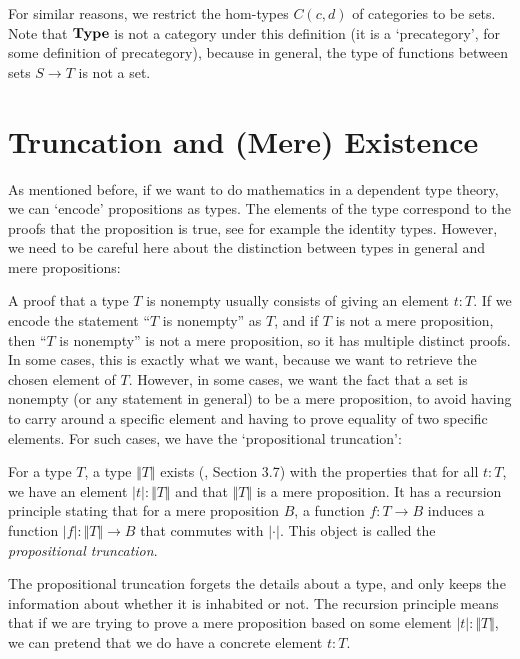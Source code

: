 For similar reasons, we restrict the hom-types $ C(c, d) $ of categories to be sets. Note that $ \mathbf{Type} $ is not a category under this definition (it is a `precategory', for some definition of precategory), because in general, the type of functions between sets $ S \to T $ is not a set.

\section{Truncation and (Mere) Existence}
As mentioned before, if we want to do mathematics in a dependent type theory, we can `encode' propositions as types. The elements of the type correspond to the proofs that the proposition is true, see for example the identity types. However, we need to be careful here about the distinction between types in general and mere propositions:

A proof that a type $ T $ is nonempty usually consists of giving an element $ t : T $. If we encode the statement ``$ T $ is nonempty'' as $ T $, and if $ T $ is not a mere proposition, then ``$ T $ is nonempty'' is not a mere proposition, so it has multiple distinct proofs. In some cases, this is exactly what we want, because we want to retrieve the chosen element of $ T $. However, in some cases, we want the fact that a set is nonempty (or any statement in general) to be a mere proposition, to avoid having to carry around a specific element and having to prove equality of two specific elements. For such cases, we have the `propositional truncation':

\begin{definition}
  For a type $ T $, a type $ \Vert T \Vert $ exists (\autocite{hottbook}, Section 3.7) with the properties that for all $ t: T $, we have an element $ \vert t \vert : \Vert T \Vert $ and that $ \Vert T \Vert $ is a mere proposition. It has a recursion principle stating that for a mere proposition $ B $, a function $ f: T \to B $ induces a function $ \vert f \vert: \Vert T \Vert \to B $ that commutes with $ \vert \cdot \vert $. This object is called the \textit{propositional truncation}.
\end{definition}
The propositional truncation forgets the details about a type, and only keeps the information about whether it is inhabited or not. The recursion principle means that if we are trying to prove a mere proposition based on some element $ \vert t \vert: \Vert T \Vert $, we can pretend that we do have a concrete element $ t: T $.

